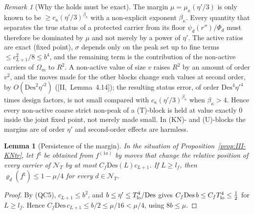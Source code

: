 \documentclass[10pt]{amsart}
\newtheorem{lemma}[theorem]{Lemma}
\theoremstyle{definition}
\theoremstyle{remark}
\newtheorem{remark}[theorem]{Remark}
\begin{document}
\begin{remark}[Why the holds must be exact]\label{rem:III-KN1}
The margin $\mu=\mu_\kappa(\eta'/3)$ is only known to be $\ge c_\kappa(\eta'/3)^
{\beta_\kappa}$ with a non-explicit exponent $\beta_\kappa$.  Every quantity that
separates the true status of a protected carrier from its floor
$\psi_d(r'')/\Phi_d$ must therefore be dominated by $\mu$ and not merely by
a power of $\eta'$.  The active ratios are exact (fixed point), $\sigma$
depends only on the peak set up to fine terms $\le c_{L+1}^2/8\le b^4$, and
the remaining term is the contribution of the non-active carriers of
$\Omega_m$ to $R^2$.  A non-active value of size $v$ raises $R^2$ by an amount
of order $v^2$, and the moves made for the other blocks change such values
at second order, by $O(\mathrm{Des}^2\eta'^2)$ ([II,~Lemma~4.14]); the resulting
status error, of order $\mathrm{Des}^4\eta'^4$ times design factors, is not
small compared with $c_\kappa(\eta'/3)^{\beta_\kappa}$ when $\beta_\kappa>4$.
Hence every non-active coarse strict non-peak of a (T)-block is held at
value exactly $0$ inside the joint fixed point, not merely made small.  In
(KN)- and (U)-blocks the margins are of order $\eta'$ and second-order
effects are harmless.
\end{remark}

\begin{lemma}[Persistence of the margin]\label{lem:III-drift}
In the situation of Proposition~\textup{\ref{prop:III-KNtr}}, let $f^\natural$ be
obtained from $f^{(1a)}$ by moves that change the relative position of every
carrier of $\mathcal N_T$ by at most $C_f\mathrm{Des}(L)c_{L+1}$.  If $L\ge l_f$,
then $\varrho_d(f^\natural)\le1-\mu/4$ for every $d\in\mathcal N_T$.
\end{lemma}

\begin{proof}
By (QC5), $c_{L+1}\le b^2$, and $b\le\eta'\le T_{\rm lo}^4/\mathrm{Des}$ gives
$C_f\mathrm{Des}\,b\le C_fT_{\rm lo}^4\le\frac12$ for $L\ge l_f$.  Hence $C_f\mathrm{Des}\,
c_{L+1}\le b/2\le\mu/16<\mu/4$, using $8b\le\mu$.
\end{proof}
\end{document}
